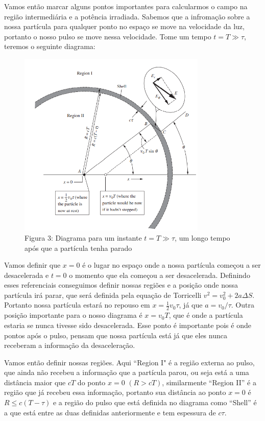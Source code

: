 \documentclass[12pt, letterpaper]{article}
\begin{document}
    Vamos então marcar alguns pontos importantes para calcularmos o campo na região intermediária e a potência irradiada. Sabemos que a infromação sobre a nossa partícula para qualquer ponto no espaço se move na velocidade da luz, portanto o nosso pulso se move nessa velocidade. Tome um tempo $t = T \gg \tau$, teremos o seguinte diagrama:

    \begin{figure}[h]
        \centering
        \includegraphics[width=0.8\textwidth]{diagrama}
        \\{Figura 3: Diagrama para um instante $t = T \gg \tau$, um longo tempo após que a partícula tenha parado}
        \label{fig:fig3}
    \end{figure}

    Vamos definir que $x = 0$ é o lugar no espaço onde a nossa partícula começou a ser desacelerada e $t = 0$ o momento que ela começou a ser desacelerada. Definindo esses referenciais conseguimos definir nossas regiões e a posição onde nossa partícula irá parar, que será definida pela equação de Torricelli $v^2 = v_0 ^2 + 2a\Delta S$. Portanto nossa partícula estará no repouso em $x = \frac{1}{2} v_0 \tau$, já que $a = v_0 /\tau$. Outra posição importante para o nosso diagrama é $x = v_0 T$, que é onde a partícula estaria se nunca tivesse sido desacelerada. Esse ponto é importante pois é onde pontos após o pulso, pensam que nossa partícula está já que eles nunca receberam a informação da desaceleração.

    Vamos então definir nossas regiões. Aqui ``Region I" é a região externa ao pulso, que ainda não recebeu a informação que a partícula parou, ou seja está a uma distância maior que $cT$ do ponto $x = 0$ $(R > cT)$, similarmente ``Region II'' é a região que já recebeu essa informação, portanto sua distância ao ponto $x = 0$ é $R \leq c(T - \tau)$ e a região do pulso que está definida no diagrama como ``Shell'' é a que está entre as duas definidas anteriormente e tem espessura de $c\tau$.
\end{document}
